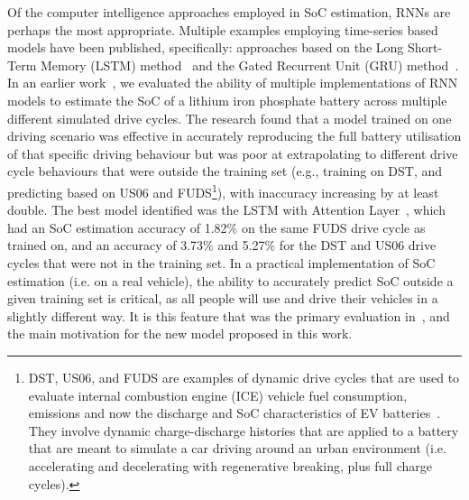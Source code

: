 %
%
Of the computer intelligence approaches employed in SoC estimation, RNNs are perhaps the most appropriate.
Multiple examples employing time-series based models have been published, specifically: approaches based on the Long Short-Term Memory (LSTM) method~\cite{Chemali2017,mamo_long_2020,zhang_deep_2020} and the Gated Recurrent Unit (GRU) method~\cite{song_lithium-ion_2018,jiao_gru-rnn_2020,xiao_accurate_2019,javid_adaptive_2020}.
In an earlier work~\cite{sadykov_practical_2022}, we evaluated the ability of multiple implementations of RNN models to estimate the SoC of a lithium iron phosphate battery across multiple different simulated drive cycles.
The research found that a model trained on one driving scenario was effective in accurately reproducing the full battery utilisation of that specific driving behaviour but was poor at extrapolating to different drive cycle behaviours that were outside the training set (e.g., training on DST, and predicting based on US06 and FUDS\footnote{DST, US06, and FUDS are examples of dynamic drive cycles that are used to evaluate internal combustion engine (ICE) vehicle fuel consumption, emissions and now the discharge and SoC characteristics of EV batteries~\cite{castillo_18_2015}. They involve dynamic charge-discharge histories that are applied to a battery that are meant to simulate a car driving around an urban environment (i.e. accelerating and decelerating with regenerative breaking, plus full charge cycles).}), with inaccuracy increasing by at least double.
The best model identified was the LSTM with Attention Layer~\cite{mamo_long_2020}, which had an SoC estimation accuracy of 1.82\% on the same FUDS drive cycle as trained on, and an accuracy of 3.73\% and 5.27\% for the DST and US06 drive cycles that were not in the training set.
In a practical implementation of SoC estimation (i.e. on a real vehicle), the ability to accurately predict SoC outside a given training set is critical, as all people will use and drive their vehicles in a slightly different way.
It is this feature that was the primary evaluation in~\cite{sadykov_practical_2022}, and the main motivation for the new model proposed in this work.

